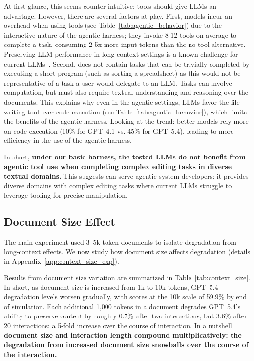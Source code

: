 \documentclass{article} %
\begin{document}
At first glance, this seems counter-intuitive: tools should give LLMs an advantage. However, there are several factors at play. First, models incur an overhead when using tools (see Table~\ref{tab:agentic_behavior}) due to the interactive nature of the agentic harness; they invoke 8-12 tools on average to complete a task, consuming 2-5x more input tokens than the no-tool alternative. Preserving LLM performance in long context settings is a known challenge for current LLMs~\citep{Liu2023LostIT, Laban2024SummaryOA}. Second, \benchmark{} does not contain tasks that can be trivially completed by executing a short program (such as sorting a spreadsheet) as this would not be representative of a task a user would delegate to an LLM. Tasks can involve computation, but must also require textual understanding and reasoning over the documents. This explains why even in the agentic settings, LLMs favor the file writing tool over code execution (see Table~\ref{tab:agentic_behavior}), which limits the benefits of the agentic harness. Looking at the trend: better models rely more on code execution (10\% for GPT~4.1 vs. 45\% for GPT~5.4), leading to more efficiency in the use of the agentic harness.

In short, \textbf{under our basic harness, the tested LLMs do not benefit from agentic tool use when completing complex editing tasks in diverse textual domains.} This suggests \benchmark{} can serve agentic system developers: it provides diverse domains with complex editing tasks where current LLMs struggle to leverage tooling for precise manipulation.

\subsection{Document Size Effect} \label{sec:context_size}

The main experiment used 3--5k token documents to isolate degradation from long-context effects. We now study how document size affects degradation (details in Appendix~\ref{app:context_size_exp}).

Results from document size variation are summarized in Table~\ref{tab:context_size}. In short, as document size is increased from 1k to 10k tokens, GPT~5.4 degradation levels worsen gradually, with scores at the 10k scale of 59.9\% by end of simulation. Each additional 1,000 tokens in a document degrades GPT~5.4's ability to preserve content by roughly 0.7\% after two interactions, but 3.6\% after 20 interactions: a 5-fold increase over the course of interaction. In a nutshell, \textbf{document size and interaction length compound multiplicatively: the degradation from increased document size snowballs over the course of the interaction.}
\end{document}
